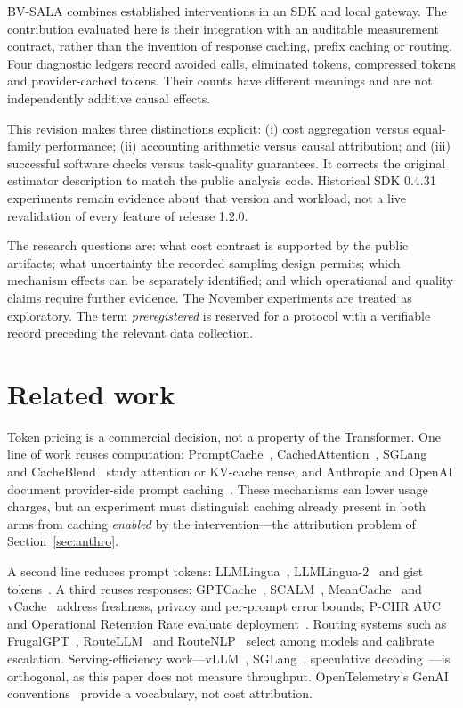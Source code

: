 \documentclass[11pt,a4paper]{article}
\begin{document}
BV-SALA combines established interventions in an SDK and local gateway. The contribution
evaluated here is their integration with an auditable measurement contract, rather than the
invention of response caching, prefix caching or routing. Four diagnostic ledgers record avoided
calls, eliminated tokens, compressed tokens and provider-cached tokens. Their counts have
different meanings and are not independently additive causal effects.

This revision makes three distinctions explicit: (i) cost aggregation versus equal-family
performance; (ii) accounting arithmetic versus causal attribution; and (iii) successful software
checks versus task-quality guarantees. It corrects the original estimator description to match the
public analysis code. Historical SDK 0.4.31 experiments remain evidence about that version and
workload, not a live revalidation of every feature of release 1.2.0.

The research questions are: what cost contrast is supported by the public artifacts; what
uncertainty the recorded sampling design permits; which mechanism effects can be separately
identified; and which operational and quality claims require further evidence. The November
experiments are treated as exploratory. The term \emph{preregistered} is reserved for a protocol
with a verifiable record preceding the relevant data collection.

\section{Related work}\label{sec:related}

Token pricing is a commercial decision, not a property of the Transformer. One line of work
reuses computation: PromptCache~\cite{promptcache}, CachedAttention~\cite{cachedatt},
SGLang~\cite{sglang} and CacheBlend~\cite{cacheblend} study attention or KV-cache reuse, and
Anthropic and OpenAI document provider-side prompt caching~\cite{anthropic-pc,openai-pc}.
These mechanisms can lower usage charges, but an experiment must distinguish caching already
present in both arms from caching \emph{enabled} by the intervention---the attribution problem
of Section~\ref{sec:anthro}.

A second line reduces prompt tokens: LLMLingua~\cite{llmlingua}, LLMLingua-2~\cite{llmlingua2}
and gist tokens~\cite{gist}. A third reuses responses: GPTCache~\cite{gptcache},
SCALM~\cite{scalm}, MeanCache~\cite{meancache} and vCache~\cite{vcache} address freshness,
privacy and per-prompt error bounds; P-CHR AUC and Operational Retention Rate evaluate
deployment~\cite{opgap}. Routing systems such as FrugalGPT~\cite{frugalgpt},
RouteLLM~\cite{routellm} and RouteNLP~\cite{routenlp} select among models and calibrate
escalation. Serving-efficiency work---vLLM~\cite{vllm}, SGLang~\cite{sglang}, speculative
decoding~\cite{specdec}---is orthogonal, as this paper does not measure throughput.
OpenTelemetry's GenAI conventions~\cite{otel} provide a vocabulary, not cost attribution.
\end{document}
